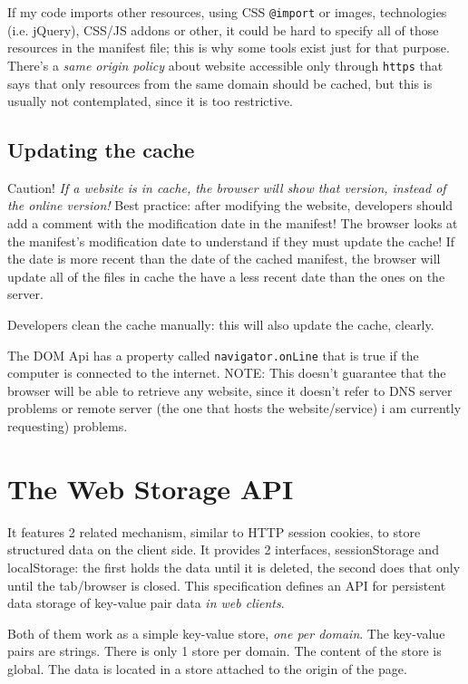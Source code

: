 \documentclass[a4paper,11pt]{book}
\begin{document}
If my code imports other resources, using CSS \texttt{@import} or images, technologies (i.e. jQuery),
CSS/JS addons or other, it could be hard
to specify all of those resources in the manifest file; this is why some tools exist just for that
purpose. There's a \textit{same origin policy} about website accessible only through \texttt{https} that says
that only resources from the same domain should be cached, but this is usually not contemplated,
since it is too restrictive.

\subsection{Updating the cache}
Caution! \emph{If a website is in cache, the browser will show that version, instead of the online version!}
Best practice: after modifying the website, developers should add a comment with the modification date in the
manifest! The browser looks at the manifest's modification date to understand if they must update the cache!
If the date is more recent than the date of the cached manifest, the browser will update all of the files
in cache the have a less recent date than the ones on the server.

Developers clean the cache manually: this will also update the cache, clearly.

The DOM Api has a property called \texttt{navigator.onLine} that is true if the computer is connected to
the internet. NOTE: This doesn't guarantee that the browser will be able to retrieve any website, since
it doesn't refer to DNS server problems or remote server (the one that hosts the website/service) i am
currently requesting) problems.

\section{The Web Storage API}
It features 2 related mechanism, similar to HTTP session cookies, to store structured data on the client side.
It provides 2 interfaces, sessionStorage and localStorage: the first holds the data until it is deleted, the
second does that only until the tab/browser is closed. This specification defines an API for persistent data
storage of key-value pair data \textit{in web clients}.

Both of them work as a simple key-value store, \textit{one per domain}. The key-value pairs are strings.
There is only 1 store per domain. The content of the store is global. The data is located in a store
attached to the origin of the page.
\end{document}
